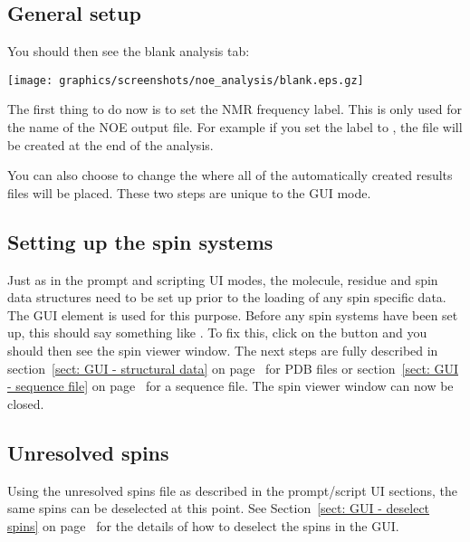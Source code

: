 
\subsection{General setup}

You should then see the blank analysis tab:

\begin{minipage}[h]{\linewidth}
\centerline{\texttt{[image: graphics/screenshots/noe\_analysis/blank.eps.gz]}}
\end{minipage}

The first thing to do now is to set the NMR frequency label.  This is only used for the name of the NOE output file.  For example if you set the label to , the file  will be created at the end of the analysis.

You can also choose to change the  where all of the automatically created results files will be placed.  These two steps are unique to the GUI mode.



\subsection{Setting up the spin systems}

Just as in the prompt and scripting UI modes, the molecule, residue and spin data structures need to be set up prior to the loading of any spin specific data.  The  GUI element is used for this purpose.  Before any spin systems have been set up, this should say something like .  To fix this, click on the  button and you should then see the spin viewer window.  The next steps are fully described in section~\ref{sect: GUI - structural data} on page~\pageref{sect: GUI - structural data} for PDB files or section~\ref{sect: GUI - sequence file} on page~\pageref{sect: GUI - sequence file} for a sequence file.  The spin viewer window can now be closed.



\subsection{Unresolved spins}

Using the unresolved spins file as described in the prompt/script UI sections, the same spins can be deselected at this point.  See Section~\ref{sect: GUI - deselect spins} on page~\pageref{sect: GUI - deselect spins} for the details of how to deselect the spins in the GUI.


